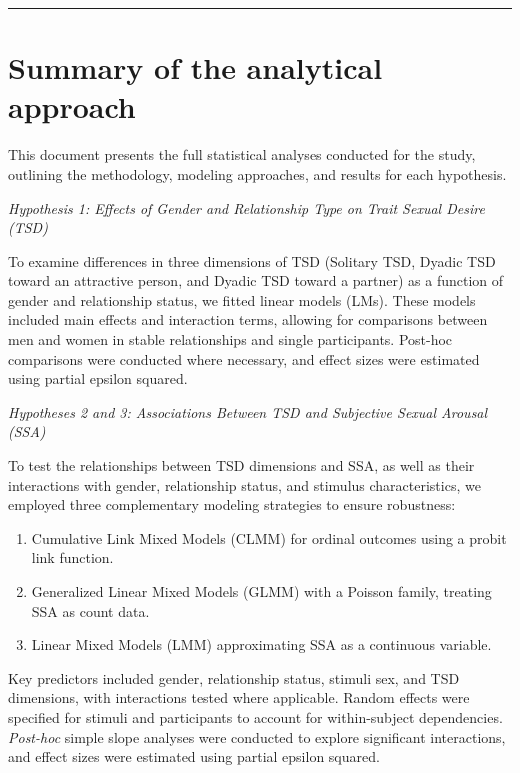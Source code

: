 \documentclass[
  bookmarksnumbered]{article}
\providecommand{\tightlist}{%
  \setlength{\itemsep}{0pt}\setlength{\parskip}{0pt}}
\begin{document}
\par
\endgroup

{\hypersetup{hidelinks}
\setcounter{tocdepth}{6}
\tableofcontents
}
\opensupplement

\begin{center}\rule{0.5\linewidth}{0.5pt}\end{center}

\section{Summary of the analytical approach}\label{summary-of-the-analytical-approach}

This document presents the full statistical analyses conducted for the study, outlining the methodology, modeling approaches, and results for each hypothesis.

\emph{Hypothesis 1: Effects of Gender and Relationship Type on Trait Sexual Desire (TSD)}

To examine differences in three dimensions of TSD (Solitary TSD, Dyadic TSD toward an attractive person, and Dyadic TSD toward a partner) as a function of gender and relationship status, we fitted linear models (LMs). These models included main effects and interaction terms, allowing for comparisons between men and women in stable relationships and single participants. Post-hoc comparisons were conducted where necessary, and effect sizes were estimated using partial epsilon squared.

\emph{Hypotheses 2 and 3: Associations Between TSD and Subjective Sexual Arousal (SSA)}

To test the relationships between TSD dimensions and SSA, as well as their interactions with gender, relationship status, and stimulus characteristics, we employed three complementary modeling strategies to ensure robustness:

\begin{enumerate}
\def\labelenumi{\arabic{enumi}.}
\tightlist
\item
  Cumulative Link Mixed Models (CLMM) for ordinal outcomes using a probit link function.
\item
  Generalized Linear Mixed Models (GLMM) with a Poisson family, treating SSA as count data.
\item
  Linear Mixed Models (LMM) approximating SSA as a continuous variable.
\end{enumerate}

Key predictors included gender, relationship status, stimuli sex, and TSD dimensions, with interactions tested where applicable. Random effects were specified for stimuli and participants to account for within-subject dependencies. \emph{Post-hoc} simple slope analyses were conducted to explore significant interactions, and effect sizes were estimated using partial epsilon squared.
\end{document}
